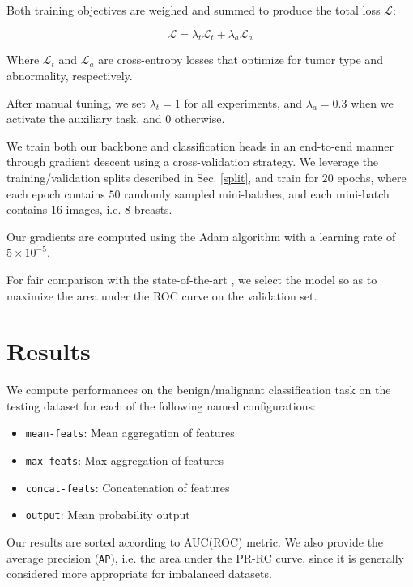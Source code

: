 \documentclass[11pt]{article}
\begin{document}
Both training objectives are weighed and summed to produce
the total loss \(\mathcal{L}\):

\begin{equation}
\mathcal{L} = \lambda_{t}\mathcal{L}_{t} + \lambda_{a}\mathcal{L}_{a}
\end{equation}

Where \(\mathcal{L}_t\) and \(\mathcal{L}_a\) are cross-entropy losses that optimize
for tumor type and abnormality, respectively.

After manual tuning, we set \(\lambda_t=1\) for all experiments,
and \(\lambda_a=0.3\) when we activate the auxiliary task, and \(0\) otherwise.

We train both our backbone and classification heads in an end-to-end manner through
gradient descent using a cross-validation strategy.
We leverage the training/validation splits described in Sec. \ref{split}, and train for
\(20\) epochs, where each epoch contains \(50\) randomly sampled mini-batches,
and each mini-batch contains \(16\) images, i.e. \(8\) breasts.

Our gradients are computed using the Adam algorithm with a learning rate of
\(5 \times 10^{-5}\).

For fair comparison with the state-of-the-art \autocite{walsh22}, we select the model so
as to maximize the area under the ROC curve on the validation set.

\section{Results}
\label{sec:org388de9a}

We compute performances on the benign/malignant classification task
on the testing dataset for each of the following named configurations:

\begin{itemize}
\item \texttt{mean-feats}: Mean aggregation of features
\item \texttt{max-feats}: Max aggregation of features
\item \texttt{concat-feats}: Concatenation of features
\item \texttt{output}: Mean probability output
\end{itemize}

Our results are sorted according to AUC(ROC) metric.
We also provide the average precision (\texttt{AP}), i.e. the area under the PR-RC curve, since
it is generally considered more appropriate for imbalanced datasets.
\end{document}
